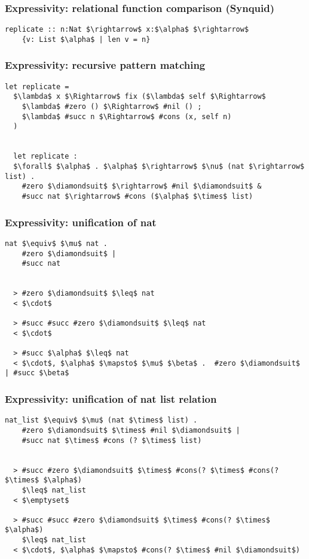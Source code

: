 \documentclass{beamer}
\begin{document}
\begin{frame}[fragile]

  \frametitle{Expressivity: relational function comparison (Synquid)}

  \begin{lstlisting}[keywords={termination, measure, data, where}]
  replicate :: n:Nat $\rightarrow$ x:$\alpha$ $\rightarrow$ 
    {v: List $\alpha$ | len v = n}

  \end{lstlisting}

  \hfill
\end{frame}

\begin{frame}[fragile]
  \frametitle{Expressivity: recursive pattern matching}
  \begin{lstlisting}[]
  let replicate = 
  $\lambda$ x $\Rightarrow$ fix ($\lambda$ self $\Rightarrow$
    $\lambda$ #zero () $\Rightarrow$ #nil () ;
    $\lambda$ #succ n $\Rightarrow$ #cons (x, self n)
  )


  let replicate : 
  $\forall$ $\alpha$ . $\alpha$ $\rightarrow$ $\nu$ (nat $\rightarrow$ list) .
    #zero $\diamondsuit$ $\rightarrow$ #nil $\diamondsuit$ & 
    #succ nat $\rightarrow$ #cons ($\alpha$ $\times$ list)
  \end{lstlisting}
\end{frame}


\begin{frame}[fragile]
  \frametitle{Expressivity: unification of nat}

  \begin{lstlisting}[]
  nat $\equiv$ $\mu$ nat .
    #zero $\diamondsuit$ | 
    #succ nat


  > #zero $\diamondsuit$ $\leq$ nat 
  < $\cdot$

  > #succ #succ #zero $\diamondsuit$ $\leq$ nat 
  < $\cdot$

  > #succ $\alpha$ $\leq$ nat 
  < $\cdot$, $\alpha$ $\mapsto$ $\mu$ $\beta$ .  #zero $\diamondsuit$ | #succ $\beta$
  \end{lstlisting} 

\end{frame}


\begin{frame}[fragile]
  \frametitle{Expressivity: unification of nat list relation}

  \begin{lstlisting}[]
  nat_list $\equiv$ $\mu$ (nat $\times$ list) .
    #zero $\diamondsuit$ $\times$ #nil $\diamondsuit$ | 
    #succ nat $\times$ #cons (? $\times$ list)


  > #succ #zero $\diamondsuit$ $\times$ #cons(? $\times$ #cons(? $\times$ $\alpha$) 
    $\leq$ nat_list
  < $\emptyset$

  > #succ #succ #zero $\diamondsuit$ $\times$ #cons(? $\times$ $\alpha$) 
    $\leq$ nat_list
  < $\cdot$, $\alpha$ $\mapsto$ #cons(? $\times$ #nil $\diamondsuit$)
  \end{lstlisting} 
\end{frame}
\end{document}
